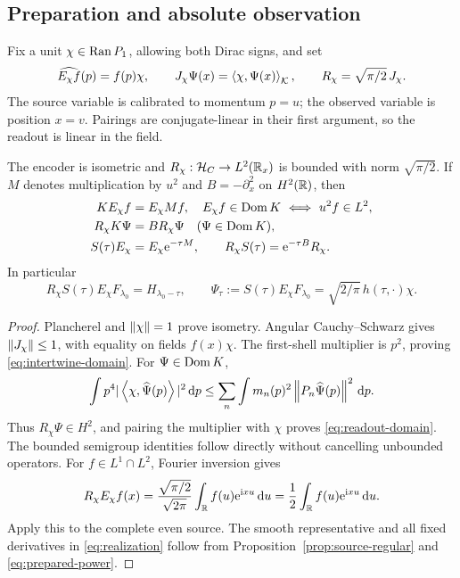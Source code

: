 \subsection{Preparation and absolute observation}
Fix a unit \(\chi\in\operatorname{Ran} P_1\), allowing both Dirac signs, and set
\begin{equation}\label{eq:encoder}
 \widehat{E_\chi f}(p)=f(p)\chi,\qquad
 J_\chi\Psi(x)=\left\langle\chi,\Psi(x)\right\rangle_\mathcal K,\qquad
 R_\chi=\sqrt{\pi/2}\,J_\chi.
\end{equation}
The source variable is calibrated to momentum \(p=u\); the observed
variable is position \(x=v\). Pairings are conjugate-linear in their
first argument, so the readout is linear in the field.

\begin{theorem}\label{thm:realization}
The encoder is isometric and \(R_\chi:\mathcal H_C\to L^2(\mathbb R_x)\) is bounded
with norm \(\sqrt{\pi/2}\). If \(M\) denotes multiplication by \(u^2\)
and \(B=-\partial_x^2\) on \(H^2(\mathbb R)\), then
\begin{align}
 KE_\chi f&=E_\chi Mf,\quad
 E_\chi f\in\operatorname{Dom} K\ \Longleftrightarrow\ u^2f\in L^2,
 \label{eq:intertwine-domain}\\
 R_\chi K\Psi&=BR_\chi\Psi\quad(\Psi\in\operatorname{Dom} K),\label{eq:readout-domain}\\
 S(\tau)E_\chi&=E_\chi\mathrm e^{-\tau M},\qquad
 R_\chi S(\tau)=\mathrm e^{-\tau B}R_\chi.\label{eq:intertwine-heat}
\end{align}
In particular
\begin{equation}\label{eq:realization}
 R_\chi S(\tau)E_\chi F_{\lambda_0}=H_{\lambda_0-\tau},\qquad
 \Psi_\tau:=S(\tau)E_\chi F_{\lambda_0}
 =\sqrt{2/\pi}\,h(\tau,\cdot)\chi.
\end{equation}
\end{theorem}
\begin{proof}
Plancherel and \(\left\lVert\chi\right\rVert=1\) prove isometry. Angular Cauchy--Schwarz
gives \(\left\lVert J_\chi\right\rVert\leq1\), with equality on fields \(f(x)\chi\).
The first-shell multiplier is \(p^2\), proving
\eqref{eq:intertwine-domain}. For \(\Psi\in\operatorname{Dom} K\),
\[
 \int p^4|\left\langle\chi,\widehat\Psi(p)\right\rangle|^2\,\mathrm d p
 \leq\sum_n\int m_n(p)^2\left\lVert P_n\widehat\Psi(p)\right\rVert^2\,\mathrm d p.
\]
Thus \(R_\chi\Psi\in H^2\), and pairing the multiplier with
\(\chi\) proves \eqref{eq:readout-domain}. The bounded semigroup
identities follow directly without cancelling unbounded operators.
For \(f\in L^1\cap L^2\), Fourier inversion gives
\[
 R_\chi E_\chi f(x)=\frac{\sqrt{\pi/2}}{\sqrt{2\pi}}
 \int_\mathbb R f(u)\mathrm e^{\mathrm i xu}\,\mathrm d u
 =\frac12\int_\mathbb R f(u)\mathrm e^{\mathrm i xu}\,\mathrm d u.
\]
Apply this to the complete even source. The smooth representative and
all fixed derivatives in \eqref{eq:realization} follow from
Proposition~\ref{prop:source-regular} and \eqref{eq:prepared-power}.
\end{proof}

